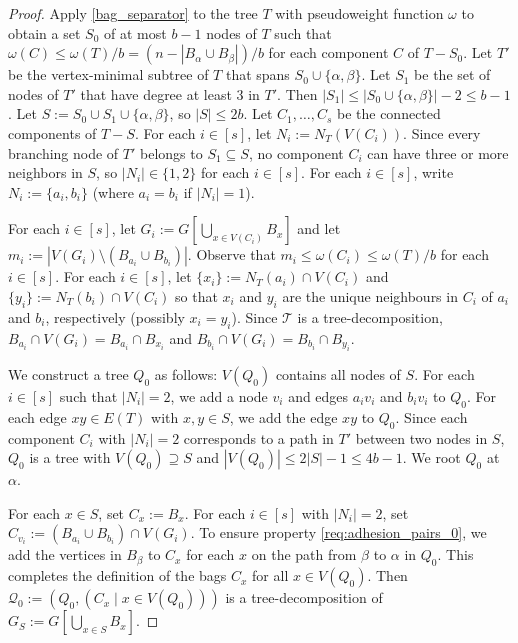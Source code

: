 \documentclass{patmorin}
\renewcommand{\le}{\leqslant}
\newcommand{\calQ}{\mathcal{Q}}
\newcommand{\calT}{\mathcal{T}}
\begin{document}
\begin{proof}
  Apply \cref{bag_separator} to the tree $T$ with pseudoweight function $\omega$ to obtain a set $S_0$ of at most $b-1$ nodes of $T$ such that $\omega(C)\le\omega(T)/b=(n-|B_\alpha\cup B_\beta|)/b$ for each component $C$ of $T-S_0$.
  Let $T'$ be the vertex-minimal subtree of $T$ that spans $S_0\cup\{\alpha,\beta\}$.  Let $S_1$ be the set of nodes of $T'$ that have degree at least $3$ in $T'$.  Then $|S_1|\le |S_0\cup\{\alpha,\beta\}|-2\le b-1$.  Let $S:=S_0\cup S_1\cup\{\alpha,\beta\}$, so $|S|\le 2b$.  Let $C_1,\ldots,C_s$ be the connected components of $T-S$.  For each $i\in[s]$, let $N_i:=N_T(V(C_i))$.  Since every branching node of $T'$ belongs to $S_1\subseteq S$, no component $C_i$ can have three or more neighbors in $S$, so $|N_i|\in\{1,2\}$ for each $i\in[s]$.  For each $i\in[s]$, write $N_i:=\{a_i,b_i\}$ (where $a_i=b_i$ if $|N_i|=1$).

  For each $i\in[s]$, let $G_i:=G[\bigcup_{x\in V(C_i)}B_x]$ and let $m_i:=|V(G_i)\setminus (B_{a_i}\cup B_{b_i})|$.  Observe that  $m_i\le\omega(C_i)\le\omega(T)/b$ for each $i\in [s]$. For each $i\in[s]$, let $\{x_i\}:=N_T(a_i)\cap V(C_i)$ and  $\{y_i\}:=N_T(b_i)\cap V(C_i)$ so that $x_i$ and $y_i$ are the unique neighbours in $C_i$ of $a_i$ and $b_i$, respectively (possibly $x_i=y_i$). Since $\calT$ is a tree-decomposition,
    $B_{a_i}\cap V(G_i)=B_{a_i}\cap B_{x_i}$ and $B_{b_i}\cap V(G_i)=B_{b_i}\cap B_{y_i}$.

  We construct a tree $Q_0$ as follows: $V(Q_0)$ contains all nodes of $S$.  For each $i\in[s]$ such that $|N_i|=2$, we add a node $v_i$ and edges $a_iv_i$ and $b_iv_i$ to $Q_0$. 
  For each edge $xy\in E(T)$ with $x,y\in S$, we add the edge $xy$ to $Q_0$.  Since each component $C_i$ with $|N_i|=2$ corresponds to a path in $T'$ between two nodes in $S$, $Q_0$ is a tree with $V(Q_0)\supseteq S$ and $|V(Q_0)|\le 2|S|-1\le 4b-1$.  We root $Q_0$ at $\alpha$.

  For each $x\in S$, set $C_x:=B_x$.  For each $i\in[s]$ with $|N_i|=2$, set $C_{v_i}:=(B_{a_i}\cup B_{b_i})\cap V(G_i)$.  To ensure property \ref{req:adhesion_pairs_0}, we add the vertices in $B_\beta$ to $C_x$ for each $x$ on the path from $\beta$ to $\alpha$ in $Q_0$.  This completes the definition of the bags $C_x$ for all $x\in V(Q_0)$.  Then $\calQ_0:=(Q_0,(C_x\mid x\in V(Q_0)))$ is a tree-decomposition of $G_S:=G[\bigcup_{x\in S}B_x]$.


\end{proof}
\end{document}
